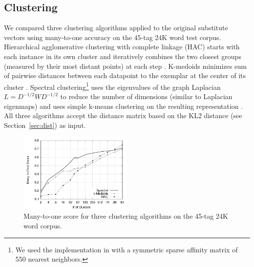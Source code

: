 \subsection{Clustering}
\label{sec:clustering}

We compared three clustering algorithms applied to the original
substitute vectors using many-to-one accuracy on the 45-tag 24K word
test corpus.  Hierarchical agglomerative clustering with complete
linkage (HAC) starts with each instance in its own cluster and
iteratively combines the two closest groups (measured by their most
distant points) at each step \cite{manning2008introduction}.
K-medoids minimizes sum of pairwise distances between each datapoint
to the exemplar at the center of its cluster
\cite{kaufman2005finding}.  Spectral clustering\footnote{We used the
  implementation in \cite{chen2011parallel} with a symmetric sparse
  affinity matrix of 550 nearest neighbors.} uses the eigenvalues of
the graph Laplacian $L=D^{-1/2} W D^{-1/2}$ to reduce the number of
dimensions (similar to Laplacian eigenmaps) and uses simple k-means
clustering on the resulting representation \cite{ng2002spectral}.  All
three algorithms accept the distance matrix based on the KL2 distance
(see Section~\ref{sec:dist}) as input.

\begin{figure}[h] \centering
\includegraphics[width=0.5\textwidth]{clustering_graph_mono.png}
\caption{Many-to-one score for three clustering algorithms on the
  45-tag 24K word corpus.}
\label{fig:clustering}
\end{figure}



